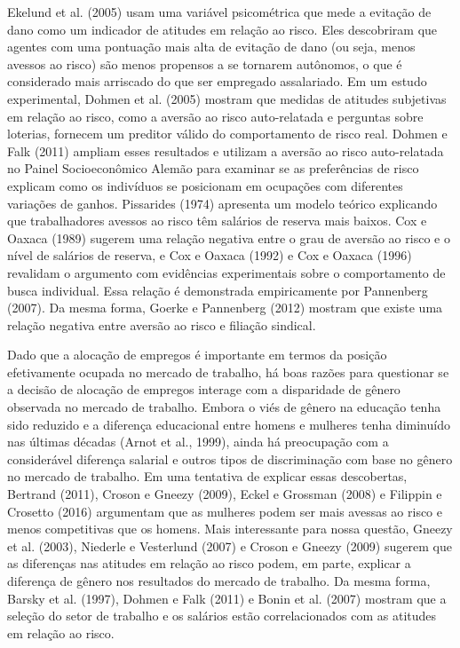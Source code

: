 \documentclass[a4paper,12pt]{article}[abntex2]
\begin{document}
Ekelund et al. (2005) usam uma variável psicométrica que mede a evitação de dano como um indicador de atitudes em relação ao risco. Eles descobriram que agentes com uma pontuação mais alta de evitação de dano (ou seja, menos avessos ao risco) são menos propensos a se tornarem autônomos, o que é considerado mais arriscado do que ser empregado assalariado. Em um estudo experimental, Dohmen et al. (2005) mostram que medidas de atitudes subjetivas em relação ao risco, como a aversão ao risco auto-relatada e perguntas sobre loterias, fornecem um preditor válido do comportamento de risco real. Dohmen e Falk (2011) ampliam esses resultados e utilizam a aversão ao risco auto-relatada no Painel Socioeconômico Alemão para examinar se as preferências de risco explicam como os indivíduos se posicionam em ocupações com diferentes variações de ganhos. Pissarides (1974) apresenta um modelo teórico explicando que trabalhadores avessos ao risco têm salários de reserva mais baixos. Cox e Oaxaca (1989) sugerem uma relação negativa entre o grau de aversão ao risco e o nível de salários de reserva, e Cox e Oaxaca (1992) e Cox e Oaxaca (1996) revalidam o argumento com evidências experimentais sobre o comportamento de busca individual. Essa relação é demonstrada empiricamente por Pannenberg (2007). Da mesma forma, Goerke e Pannenberg (2012) mostram que existe uma relação negativa entre aversão ao risco e filiação sindical.

Dado que a alocação de empregos é importante em termos da posição efetivamente ocupada no mercado de trabalho, há boas razões para questionar se a decisão de alocação de empregos interage com a disparidade de gênero observada no mercado de trabalho. Embora o viés de gênero na educação tenha sido reduzido e a diferença educacional entre homens e mulheres tenha diminuído nas últimas décadas (Arnot et al., 1999), ainda há preocupação com a considerável diferença salarial e outros tipos de discriminação com base no gênero no mercado de trabalho. Em uma tentativa de explicar essas descobertas, Bertrand (2011), Croson e Gneezy (2009), Eckel e Grossman (2008) e Filippin e Crosetto (2016) argumentam que as mulheres podem ser mais avessas ao risco e menos competitivas que os homens. Mais interessante para nossa questão, Gneezy et al. (2003), Niederle e Vesterlund (2007) e Croson e Gneezy (2009) sugerem que as diferenças nas atitudes em relação ao risco podem, em parte, explicar a diferença de gênero nos resultados do mercado de trabalho. Da mesma forma, Barsky et al. (1997), Dohmen e Falk (2011) e Bonin et al. (2007) mostram que a seleção do setor de trabalho e os salários estão correlacionados com as atitudes em relação ao risco.
\end{document}
